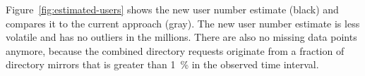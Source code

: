 \documentclass{article}
\begin{document}
Figure~\ref{fig:estimated-users} shows the new user number estimate
(black) and compares it to the current approach (gray).
The new user number estimate is less volatile and has no outliers in the
millions.
There are also no missing data points anymore, because the combined
directory requests originate from a fraction of directory mirrors that is
greater than 1~\% in the observed time interval.

\end{document}
